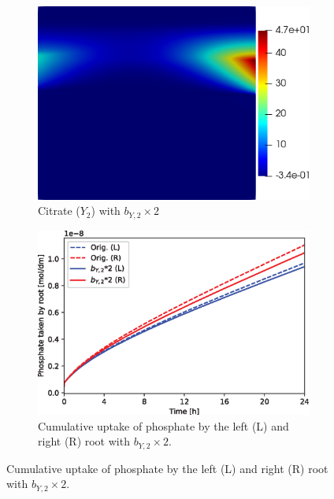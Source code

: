 \documentclass[11pt]{article}
\numberwithin{equation}{section}
\begin{document}
\begin{figure}[!htb]
\centering
\begin{subfigure}[t]{0.35\textwidth}
    \includegraphics[width=\textwidth]{Figures/Y2_bY2times2.png}
    \caption{Citrate ($Y_2$) with $b_{Y,2} \times 2$}
    \label{fig:numexp_by2up1}
\end{subfigure}
\hspace{1cm}
\begin{subfigure}[t]{0.4\textwidth}
    \includegraphics[width=\textwidth]{Figures/bY2times2.eps}
    \caption{Cumulative uptake of phosphate by the left (L) and right (R) root with $b_{Y,2} \times 2$.}
    \label{fig:numexp_by2up2}
\end{subfigure}


\end{figure}
\end{document}
